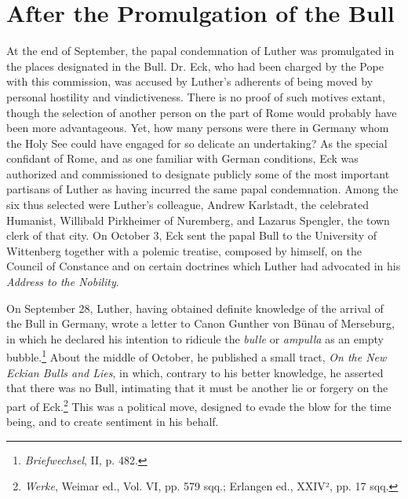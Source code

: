\section{After the Promulgation of the Bull}

At the end of September, the papal condemnation of Luther was
promulgated in the places designated in the Bull. Dr. Eck, who had
been charged by the Pope with this commission, was accused by
Luther’s adherents of being moved by personal hostility and vindictiveness.
There is no proof of such motives extant, though the selection
of another person on the part of Rome would probably have
been more advantageous. Yet, how many persons were there in Germany whom
the Holy See could have engaged for so delicate an undertaking?
As the special confidant of Rome, and as one familiar with
German conditions, Eck was authorized and commissioned to designate publicly
some of the most important partisans of Luther as having incurred the same
papal condemnation. Among the six thus selected
were Luther’s colleague, Andrew Karlstadt, the celebrated
Humanist, Willibald Pirkheimer of Nuremberg, and Lazarus Spengler, the
town clerk of that city. On October 3, Eck sent the papal
Bull to the University of Wittenberg together with a polemic treatise,
composed by himself, on the Council of Constance and on certain
doctrines which Luther had advocated in his \textit{Address to the Nobility}.

On September 28, Luther, having obtained definite knowledge of
the arrival of the Bull in Germany, wrote a letter to Canon Gunther
von Bünau of Merseburg, in which he declared his intention to ridicule
the \textit{bulle} or \textit{ampulla} as an empty bubble.\footnote{\textit{Briefwechsel}, II, p. 482.}
About the middle of
October, he published a small tract, \textit{On the New Eckian Bulls and
Lies}, in which, contrary to his better knowledge, he asserted that
there was no Bull, intimating that it must be another lie or
forgery on the part of Eck.\footnote
{\textit{Werke}, Weimar ed., Vol. VI, pp. 579 sqq.; Erlangen ed., XXIV², pp. 17 sqq.}
This was a political move, designed to
evade the blow for the time being, and to create sentiment in his
behalf.

